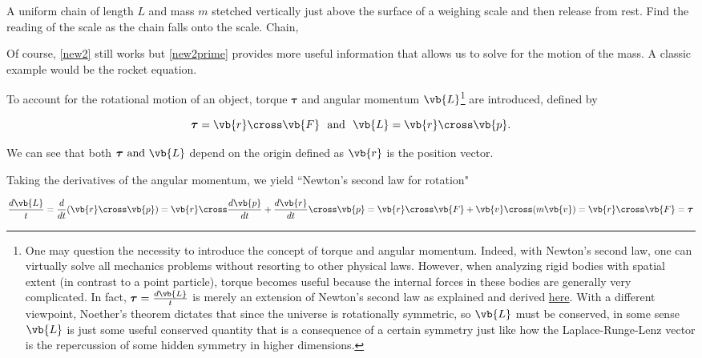 \documentclass[a4paper,12pt]{report}
\begin{document}
{A uniform chain of length \(L\) and mass \(m\) stetched vertically just above the surface of a weighing scale and then release from rest. Find the reading of the scale as the chain falls onto the scale.}
{Chain, } 



Of course, \cref{new2} still works but \cref{new2prime} provides more useful information that allows us to solve for the motion of the mass. A classic example would be the rocket equation.

To account for the rotational motion of an object, torque \(\boldsymbol{\tau } \) and angular momentum \(\vb{L} \)\footnote{One may question the necessity to introduce the concept of torque and angular momentum. Indeed, with Newton's second law, one can virtually solve all mechanics problems without resorting to other physical laws. However, when analyzing rigid bodies with spatial extent (in contrast to a point particle), torque becomes useful because the internal forces in these bodies are generally very complicated. In fact, \(\boldsymbol{\tau } = \frac{d \vb{L}}{t} \) is merely an extension of Newton's second law as explained and derived \href{https://knzhou.github.io/handouts/M2Sol.pdf}{here}. With a different viewpoint, Noether's theorem dictates that since the universe is rotationally symmetric, so \(\vb{L} \) must be conserved, in some sense \(\vb{L}\) is just some useful conserved quantity that is a consequence of a certain symmetry just like how the Laplace-Runge-Lenz vector is the repercussion of some hidden symmetry in higher dimensions.} are introduced, defined by

\begin{equation}
	\boldsymbol{\tau } = \vb{r} \cross \vb{F} ~\text { and }~ \vb{L} = \vb{r} \cross \vb{p} . 
\end{equation}

We can see that both \(\boldsymbol{\tau } \text{ and } \vb{L} \) depend on the origin defined as \(\vb{r} \) is the position vector.

Taking the derivatives of the angular momentum, we yield ``Newton's second law for rotation"

\begin{equation}
	\frac{d \vb{L}}{t} = \frac{d}{dt} (\vb{r} \cross \vb{p} ) = \vb{r} \cross \frac{d\vb{p} }{dt}  + \frac{d \vb{r}}{dt} \cross \vb{p} = \vb{r} \cross \vb{F} + \vb{v} \cross (m\vb{v} ) = \vb{r} \cross \vb{F} = \boldsymbol{\tau}  
\end{equation}
\end{document}

